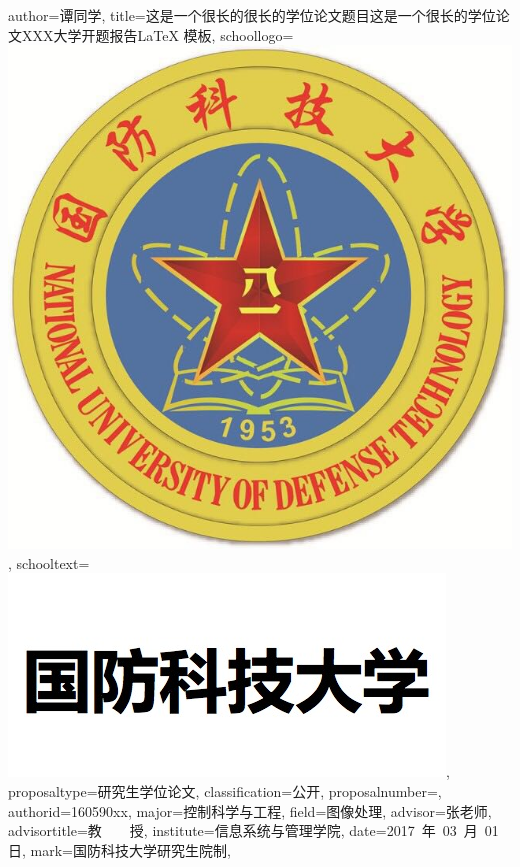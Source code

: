 \documentclass{NUDTproposal}
\begin{document}
\NUDTvalueset
{
    author={谭同学},                %
    title={这是一个很长的很长的学位论文题目这是一个很长的学位论文XXX大学开题报告\LaTeX{} 模板},                          %
    schoollogo={\includegraphics[scale=0.13]{nudt_logo_new}},
    schooltext={\includegraphics[scale=0.35]{nudt_text_new}},
    proposaltype={研究生学位论文}, %
    classification={公开},          %
    proposalnumber={\underline{}},  %
    authorid={160590xx},            %
    major={控制科学与工程},         %
    field={图像处理},               %
    advisor={张老师},               %
    advisortitle={教~~~~授},        %
    institute={信息系统与管理学院}, %
    date={2017~年~03~月~01日},      %
    mark={国防科技大学研究生院制},  %
}
\end{document}
